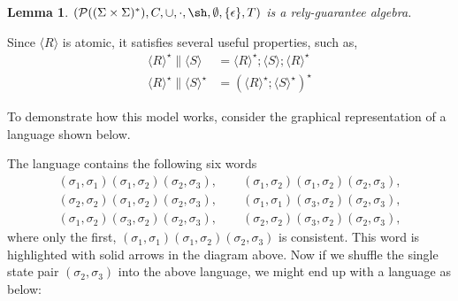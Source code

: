 \documentclass{llncs}
\DeclareMathOperator{\sha}{\sh}
\newtheorem{lem}{Lemma}
\begin{document}
\begin{lem}
$(\mathcal{P}((\Sigma\times\Sigma)^*), C, \cup, \cdot,\sha,
  \emptyset, \{\epsilon\}, T)$ is a rely-guarantee algebra.
\end{lem}
Since $\langle R\rangle$ is atomic, it satisfies several useful properties, such as,
\begin{align*}
\langle R\rangle^\star \| \langle S\rangle &= \langle R\rangle^\star; \langle S\rangle; \langle R\rangle^\star\\
\langle R\rangle^\star \| \langle S\rangle^\star &= (\langle R\rangle^\star; \langle S\rangle^\star)^\star
\end{align*}

To demonstrate how this model works, consider the graphical
representation of a language shown below.

\begin{center}
\end{center}
The language contains the following six words
\begin{align*}
(\sigma_1,\sigma_1)(\sigma_1,\sigma_2)(\sigma_2,\sigma_3), \qquad
(\sigma_1,\sigma_2)(\sigma_1,\sigma_2)(\sigma_2,\sigma_3),\\
(\sigma_2,\sigma_2)(\sigma_1,\sigma_2)(\sigma_2,\sigma_3), \qquad
(\sigma_1,\sigma_1)(\sigma_3,\sigma_2)(\sigma_2,\sigma_3),\\
(\sigma_1,\sigma_2)(\sigma_3,\sigma_2)(\sigma_2,\sigma_3), \qquad
(\sigma_2,\sigma_2)(\sigma_3,\sigma_2)(\sigma_2,\sigma_3),
\end{align*}
where only the first,
$(\sigma_1,\sigma_1)(\sigma_1,\sigma_2)(\sigma_2,\sigma_3)$ is
consistent. This word is highlighted with solid arrows in the
diagram above. Now if we shuffle the single state pair $(\sigma_2,
\sigma_3)$ into the above language, we might end up with a language as
below:
\end{document}
